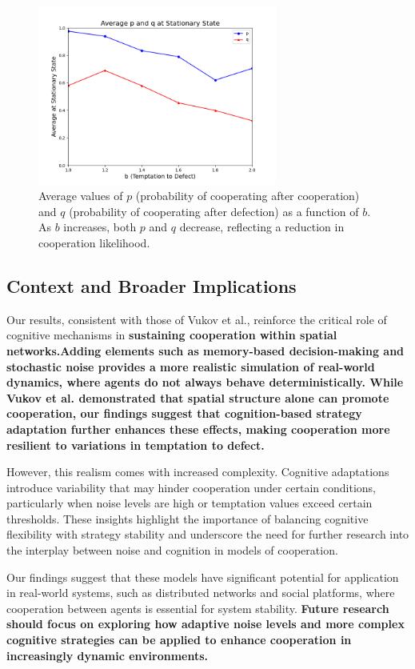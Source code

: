 \documentclass[runningheads]{llncs}
\begin{document}
\begin{figure}[htbp]
    \centering
    \includegraphics[width=0.7\textwidth]{p_q_vs_b.png}
    \caption{Average values of \( p \) (probability of cooperating after cooperation) and \( q \) (probability of cooperating after defection) as a function of \( b \). As \( b \) increases, both \( p \) and \( q \) decrease, reflecting a reduction in cooperation likelihood.}
    \label{fig:p_q_vs_b}
\end{figure}

\subsection{Context and Broader Implications}
Our results, consistent with those of Vukov et al., reinforce the critical role of cognitive mechanisms in \textbf{sustaining cooperation within spatial networks.Adding elements such as memory-based decision-making and stochastic noise provides a more realistic simulation of real-world dynamics, where agents do not always behave deterministically. While Vukov et al. demonstrated that spatial structure alone can promote cooperation, our findings suggest that cognition-based strategy adaptation further enhances these effects, making cooperation more resilient to variations in temptation to defect.}

However, this realism comes with increased complexity. Cognitive adaptations introduce variability that may hinder cooperation under certain conditions, particularly when noise levels are high or temptation values exceed certain thresholds. These insights highlight the importance of balancing cognitive flexibility with strategy stability and underscore the need for further research into the interplay between noise and cognition in models of cooperation.

Our findings suggest that these models have significant potential for application in real-world systems, such as distributed networks and social platforms, where cooperation between agents is essential for system stability. \textbf{Future research should focus on exploring how adaptive noise levels and more complex cognitive strategies can be applied to enhance cooperation in increasingly dynamic environments.}
\end{document}
